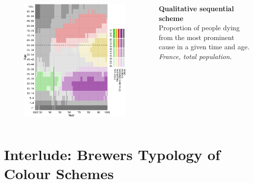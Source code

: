 \documentclass{beamer}
\begin{document}
\begin{frame}
\frametitle{\insertsection}

\begin{columns}[c]

\begin{figure}[htb!]
\includegraphics[width = 0.97\textwidth]{./fig/qual_seq.pdf}
\end{figure}

\footnotesize \textbf{Qualitative sequential scheme}\\ Proportion of people dying from the most prominent cause in a given time and age. \scriptsize\emph{France, total population.}

\end{columns}

\end{frame}

\section{Interlude: Brewers Typology of Colour Schemes} %
\end{document}
